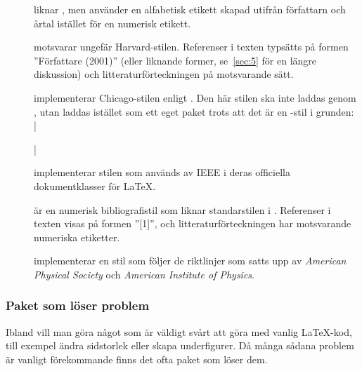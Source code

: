 \documentclass[lang=sv,ptsize=10pt,font=none,nomath,titles=bf,../../a4.tex]{subfiles}
\begin{document}
\begin{description}
	\item[]
	liknar , men använder en alfabetisk etikett skapad
	utifrån författarn och årtal istället för en numerisk etikett.

	\item[]
	motsvarar ungefär Harvard-stilen. Referenser i texten typsätts på
	formen ”Författare (2001)” (eller liknande former, se~\cref{sec:5}
	för en längre diskussion) och litteraturförteckningen på motsvarande
	sätt.

	\item[]
	implementerar Chicago-stilen enligt \textcite{Chicago10}. Den här
	stilen ska inte laddas genom , utan laddas istället
	som ett eget paket trots att det är en -stil i grunden:
	\latex|\usepackage[authordate,backend=biber]{biblatex-chicago}|

	\item[]
	implementerar stilen som används av IEEE i deras officiella
	dokumentklasser för \LaTeX.

	\item[]
	är en numerisk bibliografistil som liknar standarstilen i \BibTeX.
	Referenser i texten visas på formen ”[1]”, och litteraturförteckningen
	har motsvarande numeriska etiketter.

	\item[]
	implementerar en stil som följer de riktlinjer som satts upp av
	\emph{American Physical Society} och \emph{American Institute
	of Physics}.
\end{description}

\subsubsection{Paket som löser problem}
Ibland vill man göra något som är väldigt svårt att göra med vanlig
\LaTeX-kod, till exempel ändra sidstorlek eller skapa underfigurer. Då
många sådana problem är vanligt förekommande finns det ofta paket som
löser dem.
\end{document}
